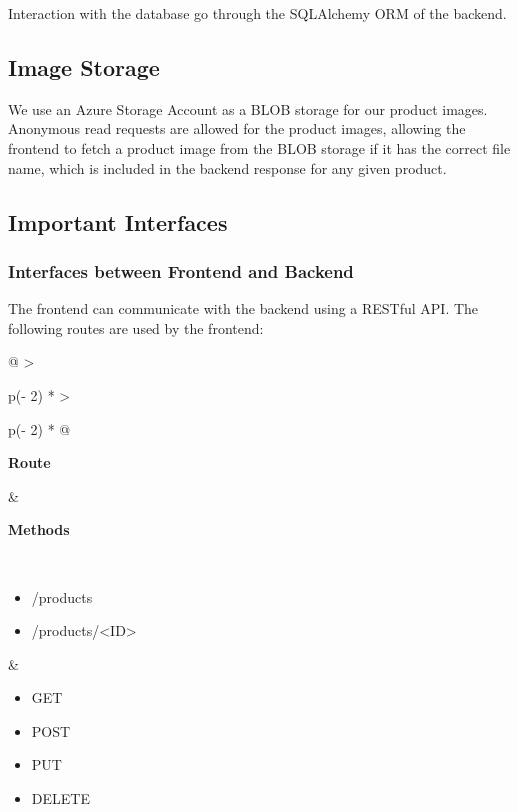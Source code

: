 Interaction with the database go through the SQLAlchemy ORM of the backend.

\subsection{Image Storage}
We use an Azure Storage Account as a BLOB storage for our product images.
Anonymous read requests are allowed for the product images,
allowing the frontend to fetch a product image from the BLOB storage
if it has the correct file name, 
which is included in the backend response for any given product.


\subsection{Important Interfaces}
\subsubsection{Interfaces between Frontend and Backend}
The frontend can communicate with the backend using a RESTful API.
The following routes are used by the frontend:
\begin{longtable}[]{@{}
    >{\raggedright\arraybackslash}p{(\columnwidth - 2\tabcolsep) * }
    >{\raggedright\arraybackslash}p{(\columnwidth - 2\tabcolsep) * }@{}}
\toprule
\begin{minipage}[b]{\linewidth}\raggedright
\textbf{Route}
\end{minipage} & \begin{minipage}[b]{\linewidth}\raggedright
\textbf{Methods}
\end{minipage} \\
\midrule
\endhead
\begin{itemize}
    \item /products
    \item /products/<ID>
\end{itemize} &
\begin{itemize}
  \item GET
  \item POST
  \item PUT
  \item DELETE
\end{itemize} \\
\bottomrule
\end{longtable}

